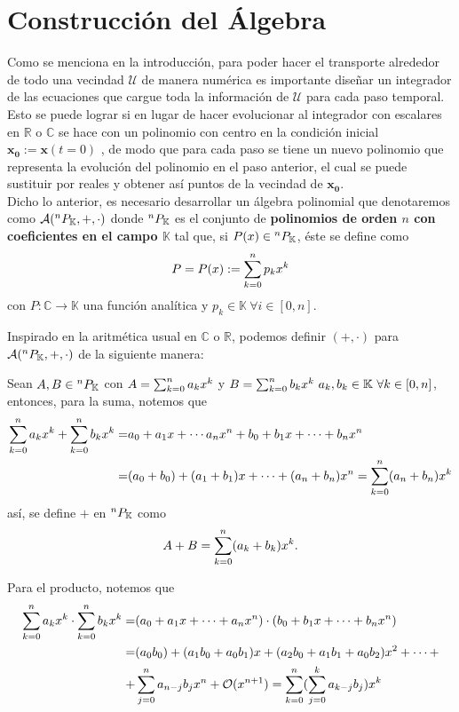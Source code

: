\section{Construcción del Álgebra}

Como se menciona en la introducción, para poder hacer el transporte alrededor de todo una vecindad $\mathcal{U}$ de manera numérica es importante diseñar un integrador de las ecuaciones que cargue toda la información de $\mathcal{U}$ para cada paso temporal. Esto se puede lograr si en lugar de hacer evolucionar al integrador con escalares en $\mathbb{R}$ o $\mathbb{C}$ se hace con un polinomio con centro en la condición inicial $\bm{x_0} := \bm{x}(t=0)$ , de modo que para cada paso se tiene un nuevo polinomio que representa la evolución del polinomio en el paso anterior, el cual se puede sustituir por reales y obtener así puntos de la vecindad de $\bm{x_0}$. \\

Dicho lo anterior, es necesario desarrollar un álgebra polinomial que denotaremos como $\mathcal{A}(^{n}P_{\mathbb{K}},+,\cdot)$ donde ${^{n}P_{\mathbb{K}}}$ es el conjunto de \textbf{polinomios de orden $n$ con coeficientes en el campo $\mathbb{K}$} tal que, si  $P(x) \in {^{n}P_{\mathbb{K}}}$, éste se define como
$$P = P(x) := \sum_{k=0}^n p_k x^k $$
con $P: \mathbb{C} \to \mathbb{K}$ una función analítica y $p_k \in \mathbb{K} \  \forall i \in [0,n]$.



Inspirado en la aritmética usual en $\mathbb{C}$ o $\mathbb{R}$, podemos definir $(+,\cdot)$ para $\mathcal{A}(^{n}P_{\mathbb{K}},+,\cdot)$ de la siguiente manera:

Sean $A,B \in {^{n}P_{\mathbb{K}}}$ con $A = \sum_{k=0}^n a_k x^k$ y $B = \sum_{k=0}^n b_k x^k \ a_k,b_k \in \mathbb{K} \ \forall k \in [0,n]$, entonces, para la suma, notemos que
\begin{align*}
\sum_{k=0}^n a_k x^k + \sum_{k=0}^n b_k x^k =& a_0 + a_1 x + \cdots a_n x^n + b_0 + b_1 x + \cdots + b_n x^n \\
=& (a_0 + b_0) + (a_1 + b_1) x + \cdots + (a_n + b_n)x^n = \sum_{k=0}^n (a_n + b_n) x^k 
\end{align*}
así, se define \textbf{$+$}  en ${^{n}P_{\mathbb{K}}}$ como
\begin{equation}
A + B = \sum_{k=0}^n (a_k + b_k) x^k.
\label{eq: polsum}
\end{equation}

Para el producto, notemos que
\begin{align*}
\sum_{k=0}^n a_k x^k\cdot\sum_{k=0}^n b_k x^k =& (a_0 + a_1 x + \cdots + a_n x^n)\cdot(b_0 + b_1 x + \cdots + b_n x^n) \\
=& (a_0b_0) + (a_1b_0 + a_0b_1) x + (a_2b_0 + a_1b_1 + a_0b_2) x^2 + \cdots + \\
+& \sum_{j=0}^n a_{n-j}b_j x^n + \mathcal{O}(x^{n+1}) = \sum_{k=0}^n  (\sum_{j=0}^k a_{k-j}b_j  )  x^k
\end{align*}

